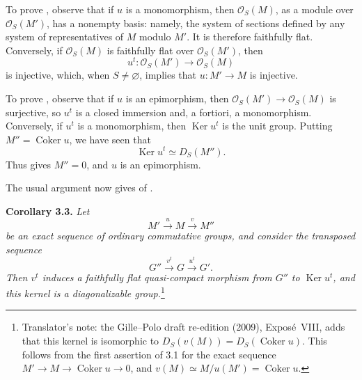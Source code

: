 To prove , observe
that if \(u\) is a monomorphism, then \(\mathcal O_S(M)\), as a module
over \(\mathcal O_S(M')\), has a nonempty basis: namely, the system of
sections defined by any system of representatives of \(M\) modulo
\(M'\). It is therefore faithfully flat. Conversely, if
\(\mathcal O_S(M)\) is faithfully flat over \(\mathcal O_S(M')\), then
\[
  u^t:\mathcal O_S(M')\longrightarrow\mathcal O_S(M)
\]
is injective, which, when \(S\ne\varnothing\), implies that
\(u:M'\to M\) is injective.

To prove , observe
that if \(u\) is an epimorphism, then
\(\mathcal O_S(M')\to\mathcal O_S(M)\) is surjective, so \(u^t\) is a
closed immersion and, a fortiori, a monomorphism. Conversely, if \(u^t\)
is a monomorphism, then \(\operatorname{Ker}u^t\) is the unit group.
Putting \(M''=\operatorname{Coker}u\), we have seen that
\[
  \operatorname{Ker}u^t\simeq D_S(M'').
\]
Thus  gives
\(M''=0\), and \(u\) is an epimorphism.

The usual argument now gives  of
.

\medskip
\noindent{}\textbf{Corollary 3.3.}
\textit{Let}
\[
  M'\xrightarrow{u}M\xrightarrow{v}M''
\]
\textit{be an exact sequence of ordinary commutative groups, and consider
the transposed sequence}
\[
  G''\xrightarrow{v^t}G\xrightarrow{u^t}G'.
\]
\textit{Then \(v^t\) induces a faithfully flat quasi-compact morphism
from \(G''\) to \(\operatorname{Ker}u^t\), and this kernel is a
diagonalizable group.}\footnote{Translator's note: the Gille--Polo draft
re-edition (2009), Expos\'e~VIII, adds that this kernel is isomorphic to
\(D_S(v(M))=D_S(\operatorname{Coker}u)\). This follows from the first assertion of 3.1 for the exact
sequence \(M'\to M\to\operatorname{Coker}u\to0\), and \(v(M)\simeq M/u(M')=\operatorname{Coker}u\).}

